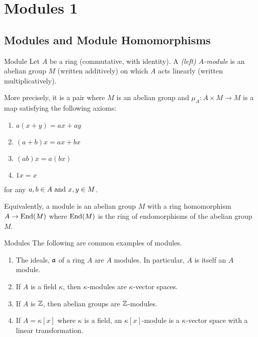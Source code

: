 \chapter{Modules 1} \label{ch:modules1}

\section{Modules and Module Homomorphisms}

\begin{definition}{Module}{}
	Let \( A \) be a ring (commutative, with identity).
	A \emph{(left) \( A \)-module} is an abelian group \( M \)
	(written additively) on which \( A \) acts linearly
	(written multiplicatively).

	More precisely, it is a pair  where \( M \)
	is an abelian group and \(\mu_A: A \times M \to M\) is a
	map satisfying the following axioms:

	\begin{enumerate}
		\item \( a(x + y) = ax + ay \)
		\item \( (a + b)x = ax + bx \)
		\item \( (ab)x = a(bx) \)
		\item \( 1x = x \)
	\end{enumerate}

	for any \( a, b \in A \text{ and } x, y \in M \).
\end{definition}

Equivalently, a module is an abelian group \( M \) with a
ring homomorphism \( A \to \operatorname{End}(M) \) where \( \operatorname{End}(M) \)
is the ring of endomorphisms of the abelian group \( M \).

\begin{example}{Modules}{}
	The following are common examples of modules.
	\begin{enumerate}
		\item The ideals, \( \mathfrak{a} \) of a ring \( A \) are \( A \)
		modules.
		In particular, \( A \) is itself an \( A \) module.
		\item If \( A \) is a field \( \kappa \), then
		\( \kappa \)-modules are \( \kappa \)-vector spaces.
		\item If \( A \) is \( \ZZ \), then abelian groups are
		\( \ZZ \)-modules.
		\item If \( A = \kappa[x] \) where \( \kappa \) is a field,
		an \( \kappa[x] \)-module is a \( \kappa \)-vector space
		with a linear transformation.
	\end{enumerate}
\end{example}


